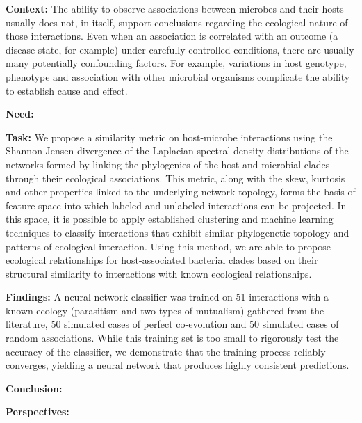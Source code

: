 
\noindent\textbf{Context:}
The ability to observe associations between microbes and their hosts usually does not, in itself, support conclusions regarding the ecological nature of those interactions. Even when an association is correlated with an outcome (a disease state, for example) under carefully controlled conditions, there are usually many potentially confounding factors. For example, variations in host genotype, phenotype and association with other microbial organisms complicate the ability to establish cause and effect.

\noindent\textbf{Need:}

\noindent\textbf{Task:}
We propose a similarity metric on host-microbe interactions using the Shannon-Jensen divergence of the Laplacian spectral density distributions of the networks formed by linking the phylogenies of the host and microbial clades through their ecological associations. This metric, along with the skew, kurtosis and other properties linked to the underlying network topology, forms the basis of feature space into which labeled and unlabeled interactions can be projected. In this space, it is possible to apply established clustering and machine learning techniques to classify interactions that exhibit similar phylogenetic topology and patterns of ecological interaction. Using this method, we are able to propose ecological relationships for host-associated bacterial clades based on their structural similarity to interactions with known ecological relationships.

\noindent\textbf{Findings:}
A neural network classifier was trained on 51 interactions with a known ecology (parasitism and two types of mutualism) gathered from the literature, 50 simulated cases of perfect co-evolution and 50 simulated cases of random associations. While this training set is too small to rigorously test the accuracy of the classifier, we demonstrate that the training process reliably converges, yielding a neural network that produces highly consistent predictions. 

\noindent\textbf{Conclusion:}

\noindent\textbf{Perspectives:}